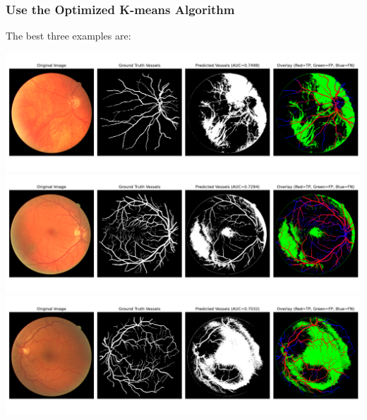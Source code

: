 \documentclass[12pt,letterpaper]{article}
\begin{document}
\subsubsection{Use the Optimized K-means Algorithm}
The best three examples are:
\begin{center}
    \includegraphics[scale=0.35]{Figures/3 Optmized 1st.png}
    \includegraphics[scale=0.35]{Figures/3 Optmized 2nd.png}
    \includegraphics[scale=0.35]{Figures/3 Optmized 3rd.png}
\end{center}
\end{document}
